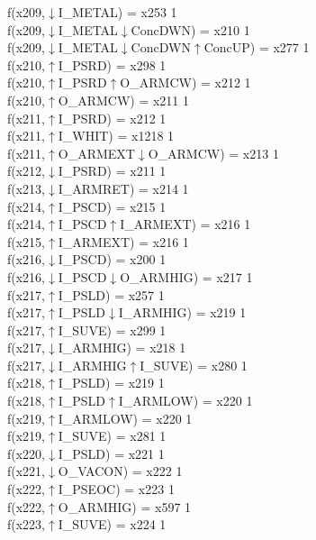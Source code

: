 f(x209,$\downarrow$I\_METAL) = x253 {1} \\
f(x209,$\downarrow$I\_METAL$\downarrow$ConcDWN) = x210 {1} \\
f(x209,$\downarrow$I\_METAL$\downarrow$ConcDWN$\uparrow$ConcUP) = x277 {1} \\
f(x210,$\uparrow$I\_PSRD) = x298 {1} \\
f(x210,$\uparrow$I\_PSRD$\uparrow$O\_ARMCW) = x212 {1} \\
f(x210,$\uparrow$O\_ARMCW) = x211 {1} \\
f(x211,$\uparrow$I\_PSRD) = x212 {1} \\
f(x211,$\uparrow$I\_WHIT) = x1218 {1} \\
f(x211,$\uparrow$O\_ARMEXT$\downarrow$O\_ARMCW) = x213 {1} \\
f(x212,$\downarrow$I\_PSRD) = x211 {1} \\
f(x213,$\downarrow$I\_ARMRET) = x214 {1} \\
f(x214,$\uparrow$I\_PSCD) = x215 {1} \\
f(x214,$\uparrow$I\_PSCD$\uparrow$I\_ARMEXT) = x216 {1} \\
f(x215,$\uparrow$I\_ARMEXT) = x216 {1} \\
f(x216,$\downarrow$I\_PSCD) = x200 {1} \\
f(x216,$\downarrow$I\_PSCD$\downarrow$O\_ARMHIG) = x217 {1} \\
f(x217,$\uparrow$I\_PSLD) = x257 {1} \\
f(x217,$\uparrow$I\_PSLD$\downarrow$I\_ARMHIG) = x219 {1} \\
f(x217,$\uparrow$I\_SUVE) = x299 {1} \\
f(x217,$\downarrow$I\_ARMHIG) = x218 {1} \\
f(x217,$\downarrow$I\_ARMHIG$\uparrow$I\_SUVE) = x280 {1} \\
f(x218,$\uparrow$I\_PSLD) = x219 {1} \\
f(x218,$\uparrow$I\_PSLD$\uparrow$I\_ARMLOW) = x220 {1} \\
f(x219,$\uparrow$I\_ARMLOW) = x220 {1} \\
f(x219,$\uparrow$I\_SUVE) = x281 {1} \\
f(x220,$\downarrow$I\_PSLD) = x221 {1} \\
f(x221,$\downarrow$O\_VACON) = x222 {1} \\
f(x222,$\uparrow$I\_PSEOC) = x223 {1} \\
f(x222,$\uparrow$O\_ARMHIG) = x597 {1} \\
f(x223,$\uparrow$I\_SUVE) = x224 {1} \\
